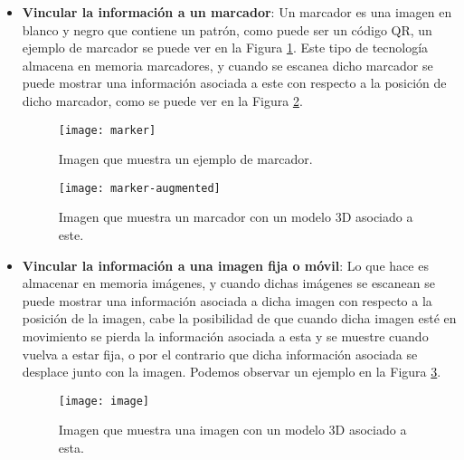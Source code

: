 \begin{itemize}
  \item \textbf{Vincular la información a un marcador}: Un marcador es una imagen en blanco y negro que contiene un patrón, como puede ser un código QR, un ejemplo de marcador se puede ver en la Figura \ref{figura-marcador}. Este tipo de tecnología almacena en memoria marcadores, y cuando se escanea dicho marcador se puede mostrar una información asociada a este con respecto a la posición de dicho marcador, como se puede ver en la Figura \ref{figura-marcador-aumentado}.

  \begin{figure}
    \centering
    \texttt{[image: marker]}
    \caption{Imagen que muestra un ejemplo de marcador.}
    \label{figura-marcador}
  \end{figure}

  \begin{figure}[h]
    \centering
    \texttt{[image: marker-augmented]}
    \caption{Imagen que muestra un marcador con un modelo 3D asociado a este.\protect\footnotemark}
    \label{figura-marcador-aumentado}
  \end{figure}


  \newpage

  \item \textbf{Vincular la información a una imagen fija o móvil}: Lo que hace es almacenar en memoria imágenes, y cuando dichas imágenes se escanean se puede mostrar una información asociada a dicha imagen con respecto a la posición de la imagen, cabe la posibilidad de que cuando dicha imagen esté en movimiento se pierda la información asociada a esta y se muestre cuando vuelva a estar fija, o por el contrario que dicha información asociada se desplace junto con la imagen. Podemos observar un ejemplo en la Figura \ref{figura-image}.

  \begin{figure}[h]
    \centering
    \texttt{[image: image]}
    \caption{Imagen que muestra una imagen con un modelo 3D asociado a esta.\protect\footnotemark}
    \label{figura-image}
  \end{figure}


  \newpage


\end{itemize}
